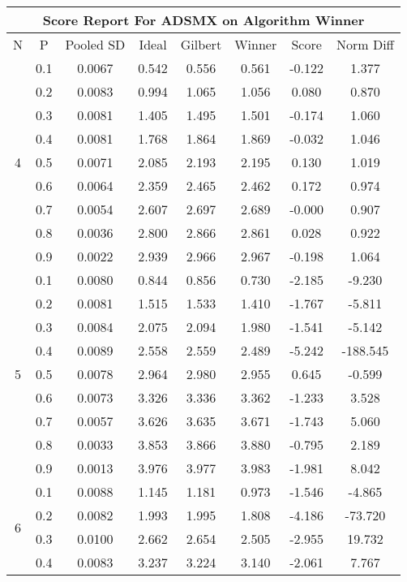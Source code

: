 \documentclass[11pt,a4paper]{report}
\begin{document}
\begin{longtable}{ | c | c || c | c | c | c | c | c | }
\hline
\multicolumn{8}{|c|}{ Score Report For ADSMX on Algorithm Winner} \\
\hline
N & P & Pooled SD &  Ideal &  Gilbert & Winner  & Score & Norm Diff \\
 \hline
 \hline
 \endhead
\multirow{9}{*}{4} & 0.1 & 0.0067 & 0.542 & 0.556 & 0.561 & -0.122 & 1.377 \\
 & 0.2 & 0.0083 & 0.994 & 1.065 & 1.056 & 0.080 & 0.870 \\
 & 0.3 & 0.0081 & 1.405 & 1.495 & 1.501 & -0.174 & 1.060 \\
 & 0.4 & 0.0081 & 1.768 & 1.864 & 1.869 & -0.032 & 1.046 \\
 & 0.5 & 0.0071 & 2.085 & 2.193 & 2.195 & 0.130 & 1.019 \\
 & 0.6 & 0.0064 & 2.359 & 2.465 & 2.462 & 0.172 & 0.974 \\
 & 0.7 & 0.0054 & 2.607 & 2.697 & 2.689 & -0.000 & 0.907 \\
 & 0.8 & 0.0036 & 2.800 & 2.866 & 2.861 & 0.028 & 0.922 \\
 & 0.9 & 0.0022 & 2.939 & 2.966 & 2.967 & -0.198 & 1.064 \\
 \hline
\multirow{9}{*}{5} & 0.1 & 0.0080 & 0.844 & 0.856 & 0.730 & -2.185 & -9.230 \\
 & 0.2 & 0.0081 & 1.515 & 1.533 & 1.410 & -1.767 & -5.811 \\
 & 0.3 & 0.0084 & 2.075 & 2.094 & 1.980 & -1.541 & -5.142 \\
 & 0.4 & 0.0089 & 2.558 & 2.559 & 2.489 & -5.242 & -188.545 \\
 & 0.5 & 0.0078 & 2.964 & 2.980 & 2.955 & 0.645 & -0.599 \\
 & 0.6 & 0.0073 & 3.326 & 3.336 & 3.362 & -1.233 & 3.528 \\
 & 0.7 & 0.0057 & 3.626 & 3.635 & 3.671 & -1.743 & 5.060 \\
 & 0.8 & 0.0033 & 3.853 & 3.866 & 3.880 & -0.795 & 2.189 \\
 & 0.9 & 0.0013 & 3.976 & 3.977 & 3.983 & -1.981 & 8.042 \\
 \hline
\multirow{9}{*}{6} & 0.1 & 0.0088 & 1.145 & 1.181 & 0.973 & -1.546 & -4.865 \\
 & 0.2 & 0.0082 & 1.993 & 1.995 & 1.808 & -4.186 & -73.720 \\
 & 0.3 & 0.0100 & 2.662 & 2.654 & 2.505 & -2.955 & 19.732 \\
 & 0.4 & 0.0083 & 3.237 & 3.224 & 3.140 & -2.061 & 7.767 \\

\end{longtable}
\end{document}
